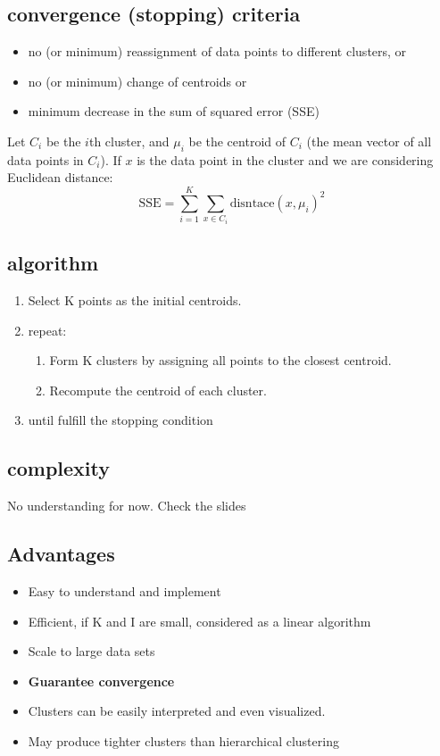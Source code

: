 \documentclass[letterpaper,12pt]{article}
\begin{document}
\subsection{convergence (stopping) criteria}
\begin{itemize}
    \item no (or minimum) reassignment of data points to different clusters, or 
    \item no (or minimum) change of centroids or 
    \item minimum decrease in the sum of squared error (SSE)
\end{itemize}

Let $C_i$ be the $i$\-th cluster, and $\mu_i$ be the centroid of $C_i$ (the mean vector of all data points in $C_i$). If $x$ is the data point in the cluster and we are considering Euclidean distance:
\[\text{SSE}=\sum_{i=1}^{K}\sum_{x\in C_i}\text{disntace}(x,\mu_i)^2\]

\subsection{algorithm}
\begin{enumerate}
    \item Select K points as the initial centroids.
    \item repeat:
    \begin{enumerate}
        \item Form K clusters by assigning all points to the closest centroid.
        \item Recompute the centroid of each cluster.
    \end{enumerate}
    \item until fulfill the stopping condition
\end{enumerate}

\subsection{complexity}
No understanding for now. Check the slides

\subsection{Advantages}
\begin{itemize}
    \item Easy to understand and implement
    \item Efficient, if K and I are small, considered as a linear algorithm
    \item Scale to large data sets
    \item \textbf{Guarantee convergence}
    \item Clusters can be easily interpreted and even visualized.
    \item May produce tighter clusters than hierarchical clustering
\end{itemize}
\end{document}
